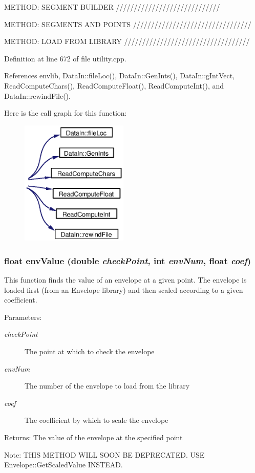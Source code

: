 METHOD: SEGMENT BUILDER /////////////////////////////

METHOD: SEGMENTS AND POINTS /////////////////////////////////

METHOD: LOAD FROM LIBRARY /////////////////////////////////// 

Definition at line 672 of file utility.cpp.

References envlib, Data\-In::file\-Loc(), Data\-In::Gen\-Ints(), Data\-In::g\-Int\-Vect, Read\-Compute\-Chars(), Read\-Compute\-Float(), Read\-Compute\-Int(), and Data\-In::rewind\-File().

Here is the call graph for this function:\begin{figure}[H]
\begin{center}
\leavevmode
\includegraphics[width=145pt]{utility_8h_a18_cgraph}
\end{center}
\end{figure}
\subsubsection{\setlength{\rightskip}{0pt plus 5cm}float env\-Value (double {\em check\-Point}, int {\em env\-Num}, float {\em coef})}\label{utility_8h_a20}


This function finds the value of an envelope at a given point. The envelope is loaded first (from an Envelope library) and then scaled according to a given coefficient. \begin{Desc}
\item[Parameters:]
\begin{description}
\item[{\em check\-Point}]The point at which to check the envelope \item[{\em env\-Num}]The number of the envelope to load from the library \item[{\em coef}]The coefficient by which to scale the envelope \end{description}
\end{Desc}
\begin{Desc}
\item[Returns:]The value of the envelope at the specified point \end{Desc}
\begin{Desc}
\item[Note:]THIS METHOD WILL SOON BE DEPRECATED. USE Envelope::Get\-Scaled\-Value INSTEAD. \end{Desc}


